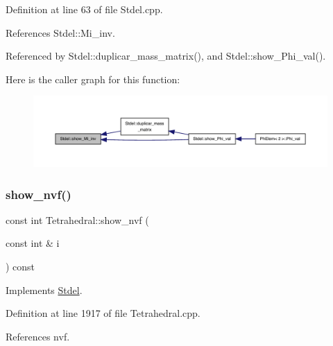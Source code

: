 Definition at line 63 of file Stdel.\+cpp.



References Stdel\+::\+Mi\+\_\+inv.



Referenced by Stdel\+::duplicar\+\_\+mass\+\_\+matrix(), and Stdel\+::show\+\_\+\+Phi\+\_\+val().

Here is the caller graph for this function\+:
\nopagebreak
\begin{figure}[H]
\begin{center}
\leavevmode
\includegraphics[width=350pt]{classStdel_a11bf2897170ada9a9dd8f641a39585e5_icgraph}
\end{center}
\end{figure}
\mbox{\label{classTetrahedral_a1359ac026b9e8d42109cc1fbdf4f6465}} 
\subsubsection{\texorpdfstring{show\+\_\+nvf()}{show\_nvf()}}
{\footnotesize\ttfamily const int Tetrahedral\+::show\+\_\+nvf (\begin{DoxyParamCaption}\item[{const int \&}]{i }\end{DoxyParamCaption}) const\hspace{0.3cm}{\ttfamily [virtual]}}



Implements \hyperlink{classStdel_a2a504322269a749dd3c443d0e86c4a6c}{Stdel}.



Definition at line 1917 of file Tetrahedral.\+cpp.



References nvf.

\mbox{\label{classStdel_a6565c36150823a1f52a2daf05806f7a4}} 
